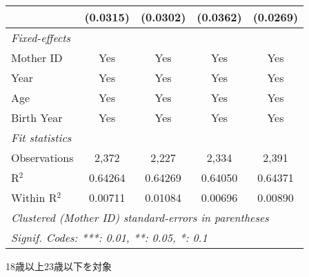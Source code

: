 \documentclass{article}
\begin{document}
\begin{landscape}
\begin{threeparttable}[b]
\begin{tabular}{lcccc}
                                                    & (0.0315)       & (0.0302) & (0.0362) & (0.0269)\\   
      \midrule
      \emph{Fixed-effects}\\
      Mother ID                                     & Yes            & Yes      & Yes      & Yes\\  
      Year                                          & Yes            & Yes      & Yes      & Yes\\  
      Age                                           & Yes            & Yes      & Yes      & Yes\\  
      Birth Year                                    & Yes            & Yes      & Yes      & Yes\\  
      \midrule
      \emph{Fit statistics}\\
      Observations                                  & 2,372          & 2,227    & 2,334    & 2,391\\  
      R$^2$                                         & 0.64264        & 0.64269  & 0.64050  & 0.64371\\  
      Within R$^2$                                  & 0.00711        & 0.01084  & 0.00696  & 0.00890\\  
      \midrule \midrule
      \multicolumn{5}{l}{\emph{Clustered (Mother ID) standard-errors in parentheses}}\\
      \multicolumn{5}{l}{\emph{Signif. Codes: ***: 0.01, **: 0.05, *: 0.1}}\\
   \end{tabular}
   
   \begin{tablenotes}\item 18歳以上23歳以下を対象
   \end{tablenotes}
\end{threeparttable}
\par\endgroup


\end{landscape}
\end{document}
